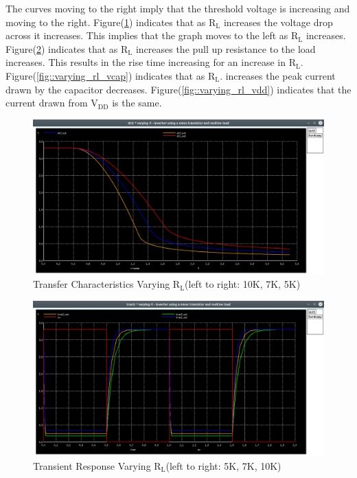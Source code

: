 \documentclass[12pt]{article}
\begin{document}
    The curves moving to the right imply that the threshold voltage is increasing and moving to the right. Figure(\ref{fig::varying_rl_dc}) indicates that as $\text{R}_\text{L}$ increases the voltage drop across it increases. This implies that the graph moves to the left as $\text{R}_\text{L}$ increases.\\
    Figure(\ref{fig::varying_rl_time}) indicates that as $\text{R}_\text{L}$ increases the pull up resistance to the load increases. This results in the rise time increasing for an increase in $\text{R}_\text{L}$.\\
    Figure(\ref{fig::varying_rl_vcap}) indicates that as $\text{R}_\text{L}$. increases the peak current drawn by the capacitor decreases. Figure(\ref{fig::varying_rl_vdd}) indicates that the current drawn from $\text{V}_{\text{DD}}$ is the same.
    \begin{figure}[H]
		\begin{center}
			\includegraphics[scale=0.25]{images/inverter_Rl_dc.png}
			\caption{Transfer Characteristics Varying $\text{R}_\text{L}$(left to right: 10K, 7K, 5K)}
			\label{fig::varying_rl_dc}
		\end{center}
	\end{figure}
	\begin{figure}[H]
		\begin{center}
			\includegraphics[scale=0.25]{images/inverter_Rl_tran.png}
			\caption{Transient Response Varying $\text{R}_\text{L}$(left to right: 5K, 7K, 10K)}
			\label{fig::varying_rl_time}
		\end{center}
	\end{figure}
	
\end{document}
